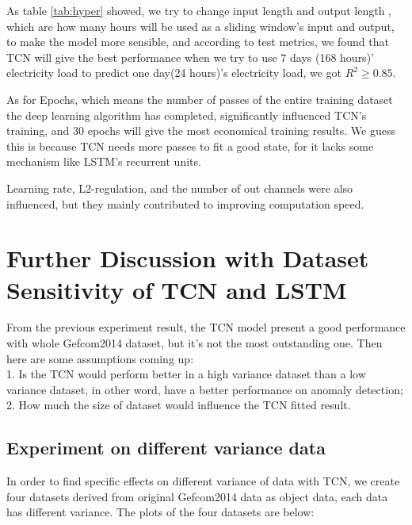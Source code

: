 As table \ref{tab:hyper} showed, we try to change input length and output length , which are how many hours will be used as a sliding window's input and output, to make the model more sensible, and according to test metrics, we found that TCN will give the best performance when we try to use 7 days (168 hours)' electricity load to predict one day(24 hours)'s electricity load, we got $R^2 \geq 0.85$.

As for Epochs, which means the number of passes of the entire training dataset the deep learning algorithm has completed, significantly influenced TCN's training, and 30 epochs will give the most economical training results. We guess this is because TCN needs more passes to fit a good state, for it lacks some mechanism like LSTM's recurrent units.

Learning rate, L2-regulation, and the number of out channels were also influenced, but they mainly contributed to improving computation speed.

\section{Further Discussion with Dataset Sensitivity of TCN and LSTM }
From the previous experiment result, the TCN model present a good performance with whole Gefcom2014 dataset, but it’s not the most outstanding one. Then here are some assumptions coming up: \\
1. Is the TCN would perform better in a high variance dataset than a low variance dataset, in other word, have a better performance on anomaly detection; \\
2. How much the size of dataset would influence the TCN fitted result. 
\subsection{Experiment on different variance data}
In order to find specific effects on different variance of data with TCN, we create four datasets derived from original Gefcom2014 data as object data, each data has different variance. The plots of the four datasets are below:

